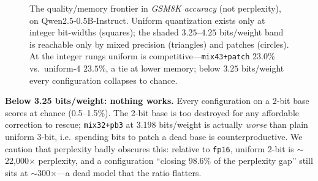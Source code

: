\documentclass[11pt]{article}
\newcommand{\bpw}{bits/weight}
\newcommand{\code}[1]{\texttt{#1}}
\begin{document}
\begin{figure}[t]
\centering
{}
\caption{The quality/memory frontier in \emph{GSM8K accuracy} (not perplexity),
on Qwen2.5-0.5B-Instruct. Uniform quantization exists only at integer
bit-widths (squares); the shaded $3.25$--$4.25$ \bpw{} band is reachable only by
mixed precision (triangles) and patches (circles). At the integer rungs uniform
is competitive---\code{mix43+patch} $23.0\%$ vs.\ uniform-4 $23.5\%$, a tie at
lower memory; below $3.25$ \bpw{} every configuration collapses to chance.}
\label{fig:frontier}
\end{figure}

\textbf{Below 3.25 \bpw{}: nothing works.} Every configuration on a 2-bit base
scores at chance (0.5--1.5\%). The 2-bit base is too destroyed for any
affordable correction to rescue; \code{mix32+pb3} at 3.198 \bpw{} is actually
\emph{worse} than plain uniform 3-bit, i.e.\ spending bits to patch a dead base
is counterproductive. We caution that perplexity badly obscures this: relative
to \code{fp16}, uniform 2-bit is $\sim$22{,}000$\times$ perplexity, and a
configuration ``closing 98.6\% of the perplexity gap'' still sits at
$\sim$300$\times$---a dead model that the ratio flatters.
\end{document}
